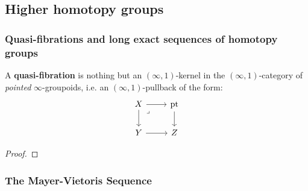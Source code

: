         \subsection{Higher homotopy groups}
            \subsubsection{Quasi-fibrations and long exact sequences of homotopy groups}
                \begin{definition} \label{def: homotopy_groups}
                    
                \end{definition}
                
                \begin{definition} \label{def: quasi_fibration}
                    A \textbf{quasi-fibration} is nothing but an $(\infty, 1)$-kernel in the $(\infty, 1)$-category of \textit{pointed} $\infty$-groupoids, i.e. an $(\infty, 1)$-pullback of the form:
                        $$
                            \begin{tikzcd}
                            	X & \pt \\
                            	Y & Z
                            	\arrow[from=1-1, to=2-1]
                            	\arrow[from=2-1, to=2-2]
                            	\arrow[from=1-2, to=2-2]
                            	\arrow[from=1-1, to=1-2]
                            	\arrow["\lrcorner"{anchor=center, pos=0.125}, draw=none, from=1-1, to=2-2]
                            \end{tikzcd}
                        $$
                \end{definition}
                
                \begin{theorem} \label{theorem: induced_long_exact_sequence_of_homotopy_groups}
                    
                \end{theorem}
                    \begin{proof}
                        
                    \end{proof}
            
            \subsubsection{The Mayer-Vietoris Sequence}
    
